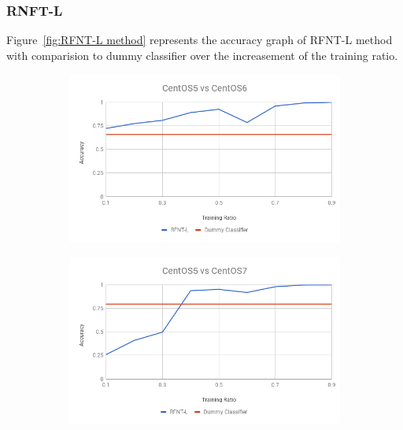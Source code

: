 \documentclass[10pt, conference, compsocconf]{IEEEtran}
\begin{document}
\subsubsection{RNFT-L}
Figure~\ref{fig:RFNT-L method} represents
the accuracy graph of RFNT-L method with comparision to dummy
classifier over the increasement of the training ratio.
\begin{figure}[h!]
        \centering
        \begin{subfigure}[b]{0.8\linewidth}
                \includegraphics[width=\columnwidth]{figures/ALS/RFNT-L-ALS-5vs6-PFS}
        \end{subfigure}
        \begin{subfigure}[b]{0.8\linewidth}
                \includegraphics[width=\columnwidth]{figures/ALS/RFNT-L-ALS-5vs7-PFS}
        \end{subfigure}
        \begin{subfigure}[b]{0.8\linewidth}

\end{subfigure}
\end{figure}
\end{document}
